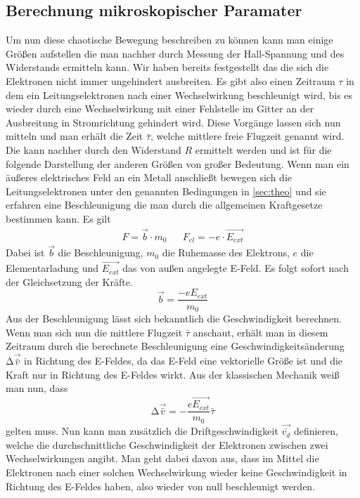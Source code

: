 \subsection{Berechnung mikroskopischer Paramater}
Um nun diese chaotische Bewegung beschreiben zu können kann man einige Größen aufstellen die man nachher durch Messung der Hall-Spannung und des Widerstands ermitteln kann.
Wir haben bereits festgestellt das die sich die Elektronen nicht immer ungehindert ausbreiten. Es gibt also einen Zeitraum $\tau$ in dem ein Leitungselektronen nach einer Wechselwirkung
beschleunigt wird, bis es wieder durch eine Wechselwirkung mit einer Fehlstelle im Gitter an der Ausbreitung in Stromrichtung gehindert wird.
Diese Vorgänge lassen sich nun mitteln und man erhält die Zeit $\bar{\tau}$, welche mittlere freie Flugzeit genannt wird.
Die kann nachher durch den Widerstand $R$ %
ermittelt werden und ist für die folgende Darstellung der anderen Größen von großer Bedeutung.
Wenn man ein äußeres elektrisches Feld an ein Metall anschließt bewegen sich die Leitungselektronen unter den genannten Bedingungen in \ref{sec:theo} und sie erfahren eine Beschleunigung
die man durch die allgemeinen Kraftgesetze bestimmen kann. Es gilt
\begin{align}
\nonumber
F = \vec{b} \cdot m_{0} && F_{el} = -e \cdot \vec{E_{ext}}
\end{align}
Dabei ist $\vec{b}$ die Beschleunigung, $m_{0}$ die Ruhemasse des Elektrons, $e$ die Elementarladung und $\vec{E_{ext}}$ das von außen angelegte E-Feld.
Es folgt sofort nach der Gleichsetzung der Kräfte.
\begin{equation}
\vec{b} = \frac{-eE_{ext}}{m_{0}}
\end{equation}
Aus der Beschleunigung lässt sich bekanntlich die Geschwindigkeit berechnen. Wenn man sich nun die mittlere Flugzeit $\bar{\tau}$ anschaut, erhält man in diesem Zeitraum durch die
berechnete Beschleunigung eine Geschwindigkeitsänderung $\increment \vec{\bar{v}}$ in Richtung des E-Feldes, da das E-Feld eine vektorielle Größe ist und die Kraft nur in Richtung des E-Feldes wirkt.
Aus der klassischen Mechanik weiß man nun, dass
\begin{equation}
\label{eqn:deltav}
\increment \vec{\bar{v}} = - \frac{e\vec{E_{ext}}}{m_{0}} \bar{\tau}
\end{equation}
gelten muss. Nun kann man zusätzlich die Driftgeschwindigkeit $\vec{\bar{v_{d}}}$ definieren, welche die durchschnittliche Geschwindigkeit der Elektronen zwischen zwei Wechselwirkungen
angibt. Man geht dabei davon aus, dass im Mittel die Elektronen nach einer solchen Wechselwirkung wieder keine Geschwindigkeit in Richtung des E-Feldes haben, also wieder von null beschleunigt werden.
